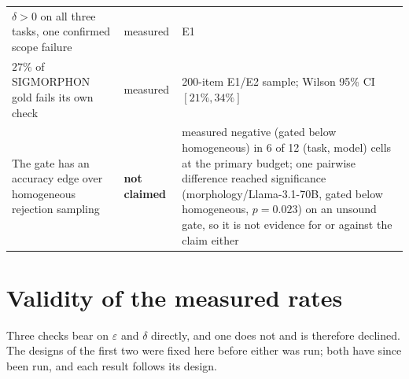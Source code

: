 \documentclass[11pt]{article}
\begin{document}
\begin{table}[!htbp]
\begin{tabular}{@{}p{3.15cm}p{1.5cm}p{2.5cm}@{}}
$\delta>0$ on all three tasks, one confirmed scope failure & measured & E1 \\[2pt]
$27\%$ of SIGMORPHON gold fails its own check & measured & 200-item E1/E2 sample; Wilson 95\% CI $[21\%,34\%]$ \\[2pt]
The gate has an accuracy edge over homogeneous rejection sampling & \textbf{not claimed} & measured negative (gated below homogeneous) in 6 of 12 (task, model) cells at the primary budget; one pairwise difference reached significance (morphology/Llama-3.1-70B, gated below homogeneous, $p=0.023$) on an unsound gate, so it is not evidence for or against the claim either \\
\bottomrule
\end{tabular}
\label{tab:claims}
\end{table}

\section{Validity of the measured rates}\label{app:validity}
Three checks bear on $\varepsilon$ and $\delta$ directly, and one does not and is
therefore declined. The designs of the first two were fixed here before either
was run; both have since been run, and each result follows its design.
\end{document}
